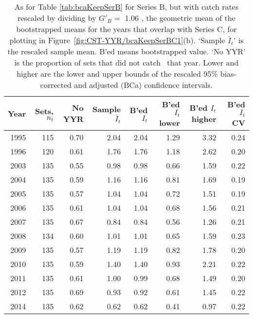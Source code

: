 \begin{table}[tp]
\centering
\caption{As for Table \ref{tab:bcaKeepSerB} for Series B, 
     but with catch rates rescaled by dividing
     by $G'_{B}=$ 1.06 , 
     the geometric mean of the bootstrapped means for the years that overlap
     with Series C, for plotting in Figure~\ref{fig:CST-YYR/bcaKeepSerBC1}(b).
     `Sample $\bar{I}_t$' is the rescaled sample mean. B'ed means bootstrapped 
     value. `No YYR' is the proportion of sets that did not catch \spName~that
     year. Lower and higher are the 
     lower and upper bounds of the rescaled 
     95\% bias-corrected and adjusted (BCa)
     confidence intervals.} 
\label{tab:serBscaled}
\begin{tabular}{rrrrrrrr}
  \hline
Year & Sets, $n_t$ & No YYR & Sample $\bar{I}_t$ & B'ed $I_t$ & B'ed $I_t$ lower & B'ed $I_t$ higher & B'ed $I_t$ CV \\ 
  \hline
1995 & 115 & 0.70 & 2.04 & 2.04 & 1.29 & 3.32 & 0.24 \\ 
  1996 & 120 & 0.61 & 1.76 & 1.76 & 1.18 & 2.62 & 0.20 \\ 
  2003 & 135 & 0.55 & 0.98 & 0.98 & 0.66 & 1.59 & 0.22 \\ 
  2004 & 135 & 0.59 & 1.16 & 1.16 & 0.81 & 1.69 & 0.19 \\ 
  2005 & 135 & 0.57 & 1.04 & 1.04 & 0.72 & 1.51 & 0.19 \\ 
  2006 & 135 & 0.61 & 1.04 & 1.04 & 0.68 & 1.56 & 0.21 \\ 
  2007 & 135 & 0.67 & 0.84 & 0.84 & 0.56 & 1.26 & 0.21 \\ 
  2008 & 134 & 0.60 & 1.01 & 1.01 & 0.65 & 1.59 & 0.23 \\ 
  2009 & 135 & 0.57 & 1.19 & 1.19 & 0.82 & 1.78 & 0.20 \\ 
  2010 & 135 & 0.59 & 1.40 & 1.40 & 0.93 & 2.21 & 0.22 \\ 
  2011 & 135 & 0.61 & 1.00 & 0.99 & 0.68 & 1.49 & 0.20 \\ 
  2012 & 135 & 0.69 & 0.93 & 0.92 & 0.61 & 1.45 & 0.22 \\ 
  2014 & 135 & 0.62 & 0.62 & 0.62 & 0.41 & 0.97 & 0.22 \\ 
   \hline
\end{tabular}
\end{table}%
